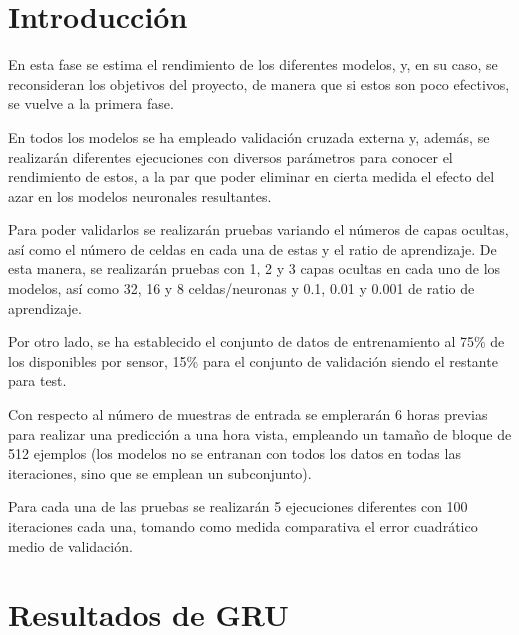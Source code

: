 
\section{Introducción}
En esta fase se estima el rendimiento de los diferentes modelos, y, en su caso, 
se reconsideran los objetivos del proyecto, de manera que si estos son poco efectivos,
se vuelve a la primera fase.

En todos los modelos se ha empleado validación cruzada externa y, además, se realizarán
diferentes ejecuciones con diversos parámetros para conocer el rendimiento de estos, a 
la par que poder eliminar en cierta medida el efecto del azar en los modelos 
neuronales resultantes.

Para poder validarlos se realizarán pruebas variando el números de capas
ocultas, así como el número de celdas en cada una de estas y el ratio de aprendizaje.
De esta manera, se realizarán pruebas con 1, 2 y 3 capas ocultas en cada uno de los modelos, 
así como 32, 16 y 8 celdas/neuronas y 0.1, 0.01 y 0.001 de ratio de aprendizaje. 

Por otro lado, se ha establecido el conjunto de datos de entrenamiento al 75\% de los disponibles
por sensor, 15\% para el conjunto de validación siendo el restante para test.

Con respecto al número de muestras de entrada se emplerarán 6 horas previas para realizar
una predicción a una hora vista, empleando un tamaño de bloque de 512 ejemplos (los modelos 
no se entranan con todos los datos en todas las iteraciones, sino que se emplean un subconjunto).

Para cada una de las pruebas se realizarán 5 ejecuciones diferentes con 100 iteraciones cada una, 
tomando como medida comparativa el error cuadrático medio de validación.

\section{Resultados de GRU}

